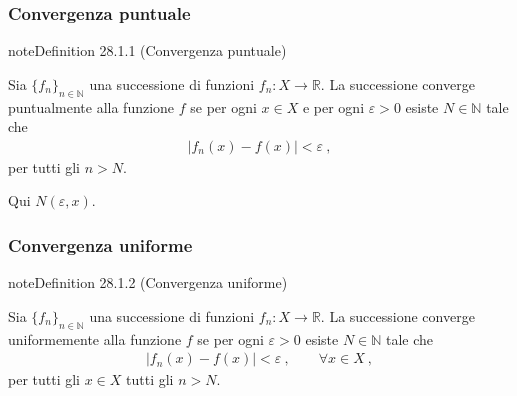 \documentclass[letterpaper,10pt,italian]{jupyterBook}
\begin{document}
\subsubsection{Convergenza puntuale}
\label{\detokenize{ch/series/series-functions-real:convergenza-puntuale}}\label{\detokenize{ch/series/series-functions-real:math-hs-series-fun-sequences-convergence-point}}\label{ch/series/series-functions-real:series-fun-seq-convergence-point}
\begin{sphinxadmonition}{note}{Definition 28.1.1 (Convergenza puntuale)}



\sphinxAtStartPar
Sia \(\{ f_n \}_{n \in \mathbb{N}}\) una successione di funzioni \(f_n:  X \rightarrow \mathbb{R}\). La successione converge puntualmente alla funzione \(f\) se per ogni \(x \in X\) e per ogni \(\varepsilon > 0\) esiste \(N \in \mathbb{N}\) tale che
\begin{equation*}
\begin{split}|f_n(x) - f(x)| < \varepsilon \ ,\end{split}
\end{equation*}
\sphinxAtStartPar
per tutti gli \(n > N\).
\end{sphinxadmonition}

\sphinxAtStartPar
{} Qui \(N(\varepsilon,x)\).


\subsubsection{Convergenza uniforme}
\label{\detokenize{ch/series/series-functions-real:convergenza-uniforme}}\label{\detokenize{ch/series/series-functions-real:math-hs-series-fun-sequences-convergence-uniform}}\label{ch/series/series-functions-real:series-fun-seq-convergence-uniform}
\begin{sphinxadmonition}{note}{Definition 28.1.2 (Convergenza uniforme)}



\sphinxAtStartPar
Sia \(\{ f_n \}_{n \in \mathbb{N}}\) una successione di funzioni \(f_n:  X \rightarrow \mathbb{R}\). La successione converge uniformemente alla funzione \(f\) se per ogni \(\varepsilon > 0\) esiste \(N \in \mathbb{N}\) tale che
\begin{equation*}
\begin{split}|f_n(x) - f(x)| < \varepsilon \ , \qquad \forall x \in X \ ,\end{split}
\end{equation*}
\sphinxAtStartPar
per tutti gli \(x \in X\) tutti gli \(n > N\).
\end{sphinxadmonition}
\end{document}
